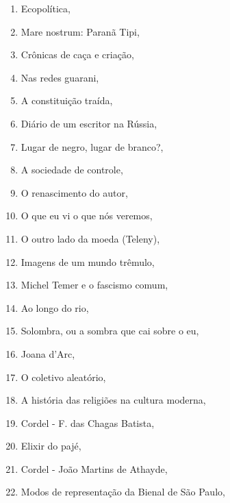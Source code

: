 \begin{multicols}{2}
\begin{enumerate}
\item Ecopolítica, {}	
\item Mare nostrum: Paranã Tipi, {}
\item Crônicas de caça e criação, {}
\item Nas redes guarani, {}
\item A constituição traída, {}
\item Diário de um escritor na Rússia, {}
\item Lugar de negro, lugar de branco?, {}
\item A sociedade de controle, {}
\item O renascimento do autor, {}
\item O que eu vi o que nós veremos, {}
\item O outro lado da moeda (Teleny), {}
\item Imagens de um mundo trêmulo, {}
\item Michel Temer e o fascismo comum, {}
\item Ao longo do rio, {}
\item Solombra, ou a sombra que cai sobre o eu, {}
\item Joana d'Arc, {}
\item O coletivo aleatório, {}
\item A história das religiões na cultura moderna, {}
\item Cordel - F. das Chagas Batista, {}
\item Elixir do pajé, {}
\item Cordel - João Martins de Athayde, {}
\item Modos de representação da Bienal de São Paulo, {}

\end{enumerate}
\end{multicols}

